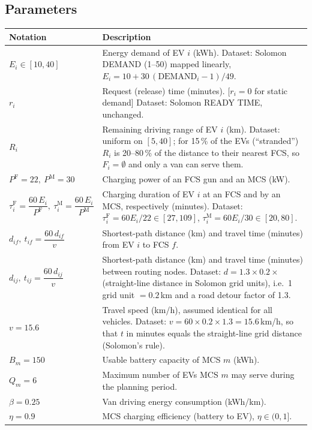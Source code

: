 \documentclass[12pt,a4paper]{article}
\begin{document}
\newpage
\subsection*{Parameters}
{\small
\begin{tabularx}{\textwidth}{@{}>{\raggedright\arraybackslash}p{4.6cm}X@{}}
\toprule
\textbf{Notation} & \textbf{Description} \\
\midrule
$E_i\in[10,40]$ & Energy demand of EV $i$ (kWh). Dataset: Solomon DEMAND (1--50) mapped linearly, $E_i=10+30\,(\text{DEMAND}_i-1)/49$. \\[2pt]
$r_i$ & Request (release) time (minutes). [$r_i=0$ for static demand] Dataset: Solomon READY TIME, unchanged. \\[2pt]
$R_i$ & Remaining driving range of EV $i$ (km). Dataset: uniform on $[5,40]$; for 15\,\% of the EVs (``stranded'') $R_i$ is 20--80\,\% of the distance to their nearest FCS, so $F_i=\emptyset$ and only a van can serve them. \\[2pt]
$P^{\mathrm F}=22,\ P^{\mathrm M}=30$ & Charging power of an FCS gun and an MCS (kW). \\[2pt]
$\tau^{\mathrm F}_i=\dfrac{60\,E_i}{P^{\mathrm F}},\ \tau^{\mathrm M}_i=\dfrac{60\,E_i}{P^{\mathrm M}}$ & Charging duration of EV $i$ at an FCS and by an MCS, respectively (minutes). Dataset: $\tau^{\mathrm F}_i=60E_i/22\in[27,109]$, $\tau^{\mathrm M}_i=60E_i/30\in[20,80]$. \\[2pt]
$d_{if},\ t_{if}=\dfrac{60\,d_{if}}{v}$ & Shortest-path distance (km) and travel time (minutes) from EV $i$ to FCS $f$. \\[2pt]
$d_{ij},\ t_{ij}=\dfrac{60\,d_{ij}}{v}$ & Shortest-path distance (km) and travel time (minutes) between routing nodes. Dataset: $d=1.3\times0.2\times$ (straight-line distance in Solomon grid units), i.e.\ 1 grid unit $=0.2$\,km and a road detour factor of 1.3. \\[2pt]
$v=15.6$ & Travel speed (km/h), assumed identical for all vehicles. Dataset: $v=60\times0.2\times1.3=15.6$\,km/h, so that $t$ in minutes equals the straight-line grid distance (Solomon's rule). \\[2pt]
$B_m=150$ & Usable battery capacity of MCS $m$ (kWh). \\[2pt]
$Q_m=6$ & Maximum number of EVs MCS $m$ may serve during the planning period. \\[2pt]
$\beta=0.25$ & Van driving energy consumption (kWh/km). \\[2pt]
$\eta=0.9$ & MCS charging efficiency (battery to EV), $\eta\in(0,1]$. \\[2pt]

\end{tabularx}}
\end{document}
